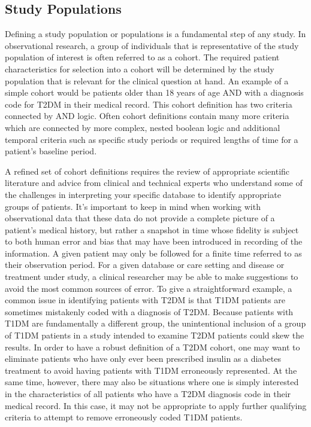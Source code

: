 \documentclass[11pt]{book}
\theoremstyle{definition}
\theoremstyle{definition}
\theoremstyle{definition}
\theoremstyle{remark}
\begin{document}
\subsection{Study Populations}\label{study-populations}

Defining a study population or populations is a fundamental step of any
study. In observational research, a group of individuals that is
representative of the study population of interest is often referred to
as a cohort. The required patient characteristics for selection into a
cohort will be determined by the study population that is relevant for
the clinical question at hand. An example of a simple cohort would be
patients older than 18 years of age AND with a diagnosis code for T2DM
in their medical record. This cohort definition has two criteria
connected by AND logic. Often cohort definitions contain many more
criteria which are connected by more complex, nested boolean logic and
additional temporal criteria such as specific study periods or required
lengths of time for a patient's baseline period.

A refined set of cohort definitions requires the review of appropriate
scientific literature and advice from clinical and technical experts who
understand some of the challenges in interpreting your specific database
to identify appropriate groups of patients. It's important to keep in
mind when working with observational data that these data do not provide
a complete picture of a patient's medical history, but rather a snapshot
in time whose fidelity is subject to both human error and bias that may
have been introduced in recording of the information. A given patient
may only be followed for a finite time referred to as their observation
period. For a given database or care setting and disease or treatment
under study, a clinical researcher may be able to make suggestions to
avoid the most common sources of error. To give a straightforward
example, a common issue in identifying patients with T2DM is that T1DM
patients are sometimes mistakenly coded with a diagnosis of T2DM.
Because patients with T1DM are fundamentally a different group, the
unintentional inclusion of a group of T1DM patients in a study intended
to examine T2DM patients could skew the results. In order to have a
robust definition of a T2DM cohort, one may want to eliminate patients
who have only ever been prescribed insulin as a diabetes treatment to
avoid having patients with T1DM erroneously represented. At the same
time, however, there may also be situations where one is simply
interested in the characteristics of all patients who have a T2DM
diagnosis code in their medical record. In this case, it may not be
appropriate to apply further qualifying criteria to attempt to remove
erroneously coded T1DM patients.
\end{document}
